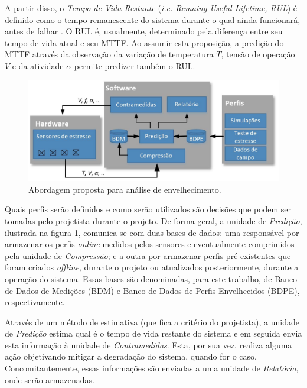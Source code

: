 A partir disso, o \textit{Tempo de Vida Restante} (\textit{i.e. Remaing Useful Lifetime, RUL}) é definido como o tempo remanescente do sistema durante o qual ainda funcionará, antes de falhar \cite{Urmanov2007}. O RUL é, usualmente, determinado pela diferença entre seu tempo de vida atual e seu MTTF. Ao assumir esta proposição, a predição do MTTF através da observação da variação de temperatura $T$, tensão de operação $V$ e da atividade $\alpha$ permite predizer também o RUL.

\begin{figure}[H]
	\center
	\includegraphics[width=1\textwidth]{images/sistema_proposta_metodologia}
	\caption{Abordagem proposta para análise de envelhecimento.}
	\label{figure:sistema_proposta_metodologia}
\end{figure}

Quais perfis serão definidos e como serão utilizados são decisões que podem ser tomadas pelo projetista durante o projeto. De forma geral, a unidade de \textit{Predição}, ilustrada na figura \ref{figure:sistema_proposta_metodologia}, comunica-se com duas bases de dados: uma responsável por armazenar os perfis \textit{online} medidos pelos sensores e eventualmente comprimidos pela unidade de \textit{Compressão}; e a outra por armazenar perfis pré-existentes que foram criados \textit{offline}, durante o projeto ou atualizados posteriormente, durante a operação do sistema. Essas bases são denominadas, para este trabalho, de Banco de Dados de Medições (BDM) e Banco de Dados de Perfis Envelhecidos (BDPE), respectivamente.

Através de um método de estimativa (que fica a critério do projetista), a unidade de \textit{Predição} estima qual é o tempo de vida restante do sistema e em seguida envia esta informação à unidade de \textit{Contramedidas}. Esta, por sua vez, realiza alguma ação objetivando mitigar a degradação do sistema, quando for o caso. Concomitantemente, essas informações são enviadas a uma unidade de \textit{Relatório}, onde serão armazenadas.

